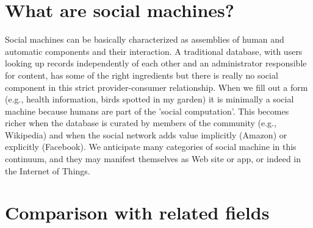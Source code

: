 \documentclass{sig-alternate}
\begin{document}
\section{What are social machines?}
Social machines can be basically characterized as assemblies of human and automatic components and their interaction. A  traditional  database,  with  users  looking  up  records  independently  of  each  other  and  an  administrator responsible for content, has some of the right ingredients but there is really no social component in this strict provider-consumer relationship. When we fill out a form (e.g., health information, birds spotted in my garden) it  is minimally  a  social machine  because humans  are  part  of  the  'social  computation'.  This  becomes  richer when  the database  is  curated by members  of  the  community  (e.g., Wikipedia) and when  the  social network adds value implicitly (Amazon) or explicitly (Facebook). We anticipate many categories of social machine in this continuum, and they may manifest themselves as Web site or app, or indeed in the Internet of Things.



\section{Comparison with related fields}
\end{document}
